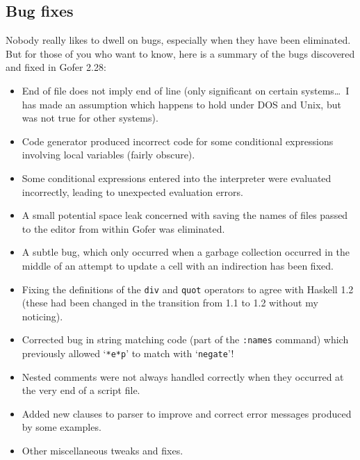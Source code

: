 \subsection{Bug fixes}
Nobody really likes to dwell on bugs, especially when they have been
eliminated.  But for those of you who want to know, here is a summary of
the bugs discovered and fixed in Gofer 2.28:
\begin{itemize}
\item  End of file does not imply end of line (only significant on
     certain systems\dots\ I has made an assumption which happens to hold
     under DOS and Unix, but was not true for other systems).

\item  Code generator produced incorrect code for some conditional
     expressions involving local variables (fairly obscure).

\item  Some conditional expressions entered into the interpreter were
     evaluated incorrectly, leading to unexpected evaluation errors.

\item  A small potential space leak concerned with saving the names of
     files passed to the editor from within Gofer was eliminated.

\item  A subtle bug, which only occurred when a garbage collection
     occurred in the middle of an attempt to update a cell with an
     indirection has been fixed.

\item  Fixing the definitions of the \verb"div" and \verb"quot" operators to agree with
     Haskell 1.2 (these had been changed in the transition from 1.1 to
     1.2 without my noticing).

\item  Corrected bug in string matching code (part of the \verb":names" command)
     which previously allowed `\verb"*e*p"' to match with `\verb"negate"'!

\item  Nested comments were not always handled correctly when they
     occurred at the very end of a script file.

\item  Added new clauses to parser to improve and correct error messages
     produced by some examples.

\item  Other miscellaneous tweaks and fixes.
\end{itemize}

